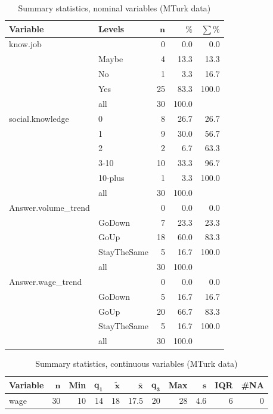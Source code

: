 \documentclass[a4paper,10pt]{article}\usepackage[]{graphicx}\usepackage[]{color}
\begin{document}
\begin{table}[ht]
\centering
{\footnotesize
\begin{tabular}{ll|rrr}
 \textbf{Variable} & \textbf{Levels} & $\mathbf{n}$ & $\mathbf{\%}$ & $\mathbf{\sum \%}$ \\ 
  \hline
know.job &  & 0 & 0.0 & 0.0 \\ 
   & Maybe & 4 & 13.3 & 13.3 \\ 
   & No & 1 & 3.3 & 16.7 \\ 
   & Yes & 25 & 83.3 & 100.0 \\ 
   \hline
 & all & 30 & 100.0 &  \\ 
   \hline
\hline
social.knowledge & 0 & 8 & 26.7 & 26.7 \\ 
   & 1 & 9 & 30.0 & 56.7 \\ 
   & 2 & 2 & 6.7 & 63.3 \\ 
   & 3-10 & 10 & 33.3 & 96.7 \\ 
   & 10-plus & 1 & 3.3 & 100.0 \\ 
   \hline
 & all & 30 & 100.0 &  \\ 
   \hline
\hline
Answer.volume\_trend &  & 0 & 0.0 & 0.0 \\ 
   & GoDown & 7 & 23.3 & 23.3 \\ 
   & GoUp & 18 & 60.0 & 83.3 \\ 
   & StayTheSame & 5 & 16.7 & 100.0 \\ 
   \hline
 & all & 30 & 100.0 &  \\ 
   \hline
\hline
Answer.wage\_trend &  & 0 & 0.0 & 0.0 \\ 
   & GoDown & 5 & 16.7 & 16.7 \\ 
   & GoUp & 20 & 66.7 & 83.3 \\ 
   & StayTheSame & 5 & 16.7 & 100.0 \\ 
   \hline
 & all & 30 & 100.0 &  \\ 
   \hline
\hline
\end{tabular}
}
\caption{Summary statistics, nominal variables (MTurk data)} 
\label{tab1:25-3090}
\end{table}
\begin{table}[ht]
\centering
{\footnotesize
\begin{tabular}{lrrrrrrrrrr}
 \textbf{Variable} & $\mathbf{n}$ & \textbf{Min} & $\mathbf{q_1}$ & $\mathbf{\widetilde{x}}$ & $\mathbf{\bar{x}}$ & $\mathbf{q_3}$ & \textbf{Max} & $\mathbf{s}$ & \textbf{IQR} & \textbf{\#NA} \\ 
  \hline
wage & 30 & 10 & 14 & 18 & 17.5 & 20 & 28 & 4.6 & 6 & 0 \\ 
  \end{tabular}
}
\caption{Summary statistics, continuous variables (MTurk data)} 
\label{tab2:25-3090}
\end{table}
\end{document}
